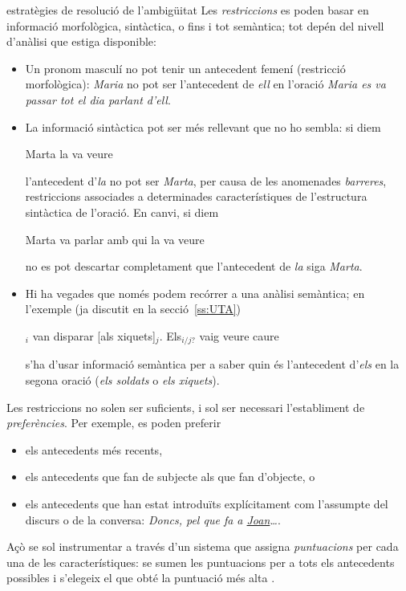 \begin{persabermes}{estratègies de resolució de l'ambigüitat}
  Les \emph{restriccions} es poden basar en informació morfològica,
  sintàctica, o fins i tot semàntica; tot depén del nivell d'anàlisi
  que estiga disponible:
  \begin{itemize}
  \item Un pronom masculí no pot tenir un antecedent femení
    (restricció morfològica): \emph{Maria} no pot ser l'antecedent de
    \emph{ell} en l'oració \emph{Maria es va passar tot el dia parlant
      d'ell}.
  \item La informació sintàctica pot ser més rellevant que no ho
    sembla: si diem
    \begin{exemple}
      Marta la va veure
    \end{exemple} 
    l'antecedent d'\emph{la} no pot ser \emph{Marta}, per causa de les anomenades \emph{barreres}, 
    restriccions associades a determinades característiques de
    l'estructura sintàctica de l'oració.
    En canvi, si diem
    \begin{exemple}
      Marta va parlar amb qui la va veure
    \end{exemple} 
    no es pot descartar completament que l'antecedent de \emph{la}
    siga \emph{Marta}.
  \item Hi ha vegades que només podem recórrer a una anàlisi
    semàntica; en l'exemple (ja discutit en la secció~\ref{ss:UTA})
    \begin{exemple} 
      $_i$ van disparar [als xiquets]$_j$. Els$_{i/j?}$
      vaig veure caure
    \end{exemple}
    s'ha d'usar informació semàntica per a saber quin és l'antecedent
    d'\emph{els} en la segona oració (\emph{els soldats} o \emph{els
      xiquets}).
  \end{itemize}

  Les restriccions no solen ser suficients, i sol ser necessari
  l'establiment de \emph{preferències}. Per exemple, es poden preferir
  \begin{itemize}
  \item els antecedents més recents,
  \item els antecedents que fan de subjecte als que fan d'objecte, o
  \item els antecedents que han estat introduïts explícitament com
    l'assumpte del discurs o de la conversa: \emph{Doncs, pel que fa a
      \underline{Joan}\ldots}.
  \end{itemize}
  Açò se sol instrumentar a través d'un sistema que assigna
  \emph{puntuacions} per cada una de les característiques: se sumen
  les puntuacions per a tots els antecedents possibles i s'elegeix el
  que obté la puntuació més alta \citep{lappin94j}.


\end{persabermes}

